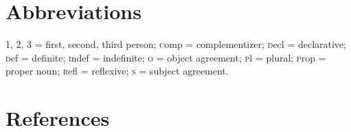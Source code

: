 \documentclass[output=paper]{LSP/langsci}
\begin{document}
\section*{Abbreviations}
1, 2, 3 = first, second, third person; {\textsc comp} = complementizer; {\textsc decl} = declarative; {\textsc def} = definite; {\textsc indef} = indefinite; {\textsc o} = object agreement; {\textsc pl} = plural; {\textsc prop} = proper noun; {\textsc refl} = reflexive; {\textsc s} = subject agreement. 

\section*{References}

\newenvironment{reflist} {\begin{list} {} {\listparindent -.25in
\leftmargin .3in} \item \ \vspace{-.3in} } {\end{list} }
\end{document}
